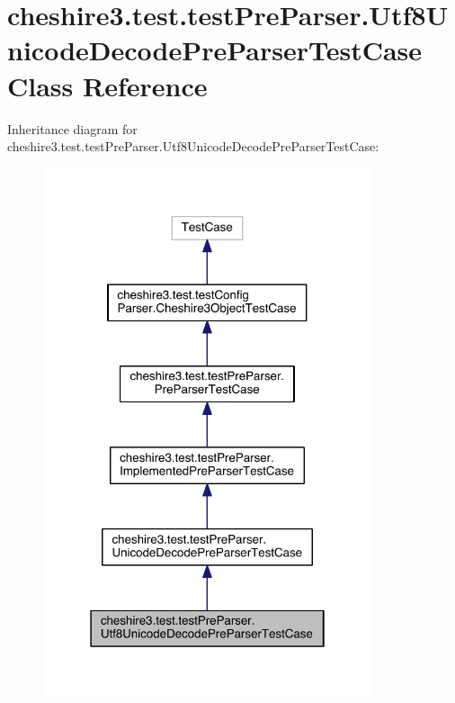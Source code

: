 \hypertarget{classcheshire3_1_1test_1_1test_pre_parser_1_1_utf8_unicode_decode_pre_parser_test_case}{\section{cheshire3.\-test.\-test\-Pre\-Parser.\-Utf8\-Unicode\-Decode\-Pre\-Parser\-Test\-Case Class Reference}
\label{classcheshire3_1_1test_1_1test_pre_parser_1_1_utf8_unicode_decode_pre_parser_test_case}
}


Inheritance diagram for cheshire3.\-test.\-test\-Pre\-Parser.\-Utf8\-Unicode\-Decode\-Pre\-Parser\-Test\-Case\-:
\nopagebreak
\begin{figure}[H]
\begin{center}
\leavevmode
\includegraphics[width=274pt]{classcheshire3_1_1test_1_1test_pre_parser_1_1_utf8_unicode_decode_pre_parser_test_case__inherit__graph}
\end{center}
\end{figure}


